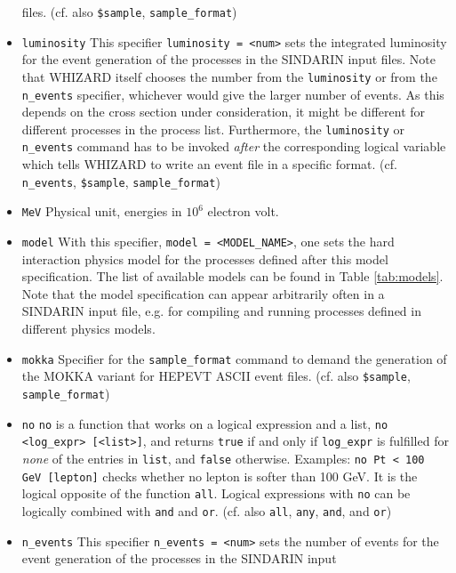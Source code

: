 \documentclass[12pt]{book}
\newcommand{\ttt}[1]{\texttt{#1}}
\begin{document}
\begin{itemize}
files. (cf. also \ttt{\$sample}, 
\ttt{sample\_format}) 
\item
\ttt{luminosity}
This specifier \ttt{luminosity = <num>} sets the integrated luminosity
for the event generation of the processes in the SINDARIN input
files. Note that WHIZARD itself chooses the number from the
\ttt{luminosity} or from the \ttt{n\_events} specifier, whichever
would give the larger number of events. As this depends on the cross
section under consideration, it might be different for different
processes in the process list. 
Furthermore, the \ttt{luminosity} or \ttt{n\_events} command has to be
invoked {\em after} the corresponding logical variable which tells
WHIZARD to write an event file in a specific format.
(cf. \ttt{n\_events}, \ttt{\$sample}, \ttt{sample\_format})
\item
\ttt{MeV} \newline
Physical unit, energies in $10^6$ electron volt.
\item
\ttt{model} \newline
With this specifier, \ttt{model = <MODEL\_NAME>}, one sets the hard
interaction physics model for the processes defined after this model
specification. The list of available models can be found in Table
\ref{tab:models}. Note that the model specification can appear
arbitrarily often in a SINDARIN input file, e.g. for compiling and
running processes defined in different physics models. 
\item
\ttt{mokka} \newline 
Specifier for the \ttt{sample\_format} command to demand the
generation of the MOKKA variant for HEPEVT ASCII event
files. (cf. also \ttt{\$sample}, 
\ttt{sample\_format}) 
\item
\ttt{no} \newline
\ttt{no} is a function that works on a logical expression and a list, 
\ttt{no <log\_expr> [<list>]}, and returns \ttt{true} if and only if
\ttt{log\_expr} is fulfilled for {\em none} of the entries in
\ttt{list}, and \ttt{false} otherwise. Examples: \ttt{no Pt < 100 GeV
  [lepton]} checks whether no lepton is softer than 100 GeV. It is the
logical opposite of the function \ttt{all}. Logical expressions with
\ttt{no} can be logically combined with \ttt{and} and
\ttt{or}. (cf. also \ttt{all}, \ttt{any}, \ttt{and}, and \ttt{or}) 
\item
\ttt{n\_events} \newline
This specifier \ttt{n\_events = <num>} sets the number of events
for the event generation of the processes in the SINDARIN input

\end{itemize}
\end{document}

